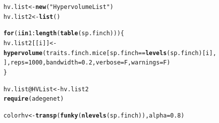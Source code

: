 \documentclass[12pt]{article}\usepackage[]{graphicx}\usepackage[]{color}
\makeatletter
\newcommand{\hlnum}[1]{\textcolor[rgb]{0.686,0.059,0.569}{#1}}%
\newcommand{\hlstr}[1]{\textcolor[rgb]{0.192,0.494,0.8}{#1}}%
\newcommand{\hlopt}[1]{\textcolor[rgb]{0,0,0}{#1}}%
\newcommand{\hlstd}[1]{\textcolor[rgb]{0.345,0.345,0.345}{#1}}%
\newcommand{\hlkwa}[1]{\textcolor[rgb]{0.161,0.373,0.58}{\textbf{#1}}}%
\newcommand{\hlkwb}[1]{\textcolor[rgb]{0.69,0.353,0.396}{#1}}%
\newcommand{\hlkwc}[1]{\textcolor[rgb]{0.333,0.667,0.333}{#1}}%
\newcommand{\hlkwd}[1]{\textcolor[rgb]{0.737,0.353,0.396}{\textbf{#1}}}%
\newenvironment{kframe}{%
 \def\at@end@of@kframe{}%
 \ifinner\ifhmode%
  \def\at@end@of@kframe{\end{minipage}}%
  \begin{minipage}{\columnwidth}%
 \fi\fi%
 \def\FrameCommand##1{\hskip\@totalleftmargin \hskip-\fboxsep
 \colorbox{shadecolor}{##1}\hskip-\fboxsep
     \hskip-\linewidth \hskip-\@totalleftmargin \hskip\columnwidth}%
 \MakeFramed {\advance\hsize-\width
   \@totalleftmargin\z@ \linewidth\hsize
   \@setminipage}}%
 {\par\unskip\endMakeFramed%
 \at@end@of@kframe}
\newenvironment{knitrout}{}{} %
\makeatother
\begin{document}
\begin{knitrout}
\color{fgcolor}\begin{kframe}
\begin{alltt}
\hlstd{hv.list} \hlkwb{<-} \hlkwd{new}\hlstd{(}\hlstr{"HypervolumeList"}\hlstd{)}
\hlstd{hv.list2} \hlkwb{<-} \hlkwd{list}\hlstd{()}

\hlkwa{for} \hlstd{(i} \hlkwa{in} \hlnum{1}\hlopt{:}\hlkwd{length}\hlstd{(}\hlkwd{table}\hlstd{(sp.finch))) \{}
    \hlstd{hv.list2[[i]]} \hlkwb{<-} \hlkwd{hypervolume}\hlstd{(traits.finch.mice[sp.finch} \hlopt{==} \hlkwd{levels}\hlstd{(sp.finch)[i],}
        \hlstd{],} \hlkwc{reps} \hlstd{=} \hlnum{1000}\hlstd{,} \hlkwc{bandwidth} \hlstd{=} \hlnum{0.2}\hlstd{,} \hlkwc{verbose} \hlstd{= F,} \hlkwc{warnings} \hlstd{= F)}
\hlstd{\}}

\hlstd{hv.list}\hlopt{@}\hlkwc{HVList} \hlkwb{<-} \hlstd{hv.list2}
\hlkwd{require}\hlstd{(adegenet)}
\end{alltt}


{\ttfamily\noindent\itshape\color{messagecolor}{\#\# Loading required package: adegenet\\\#\#\ \ \ \ ==========================\\\#\#\ \ \ \  adegenet 1.4-1 is loaded\\\#\#\ \ \ \ ==========================\\\#\# \\\#\#\ \ - to start, type '?adegenet'\\\#\#\ \ - to browse adegenet website, type 'adegenetWeb()'\\\#\#\ \ - to post questions/comments: adegenet-forum@lists.r-forge.r-project.org}}\begin{alltt}
\hlstd{colorhv} \hlkwb{<-} \hlkwd{transp}\hlstd{(}\hlkwd{funky}\hlstd{(}\hlkwd{nlevels}\hlstd{(sp.finch)),} \hlkwc{alpha} \hlstd{=} \hlnum{0.8}\hlstd{)}


\end{alltt}
\end{kframe}
\end{knitrout}
\end{document}
